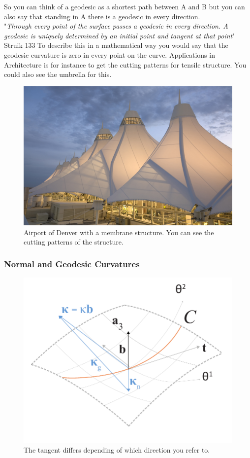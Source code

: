 So you can think of a geodesic as a shortest path between A and B but you can also say that standing in A there is a geodesic in every direction.\\
"\textit{Through every point of the surface passes a geodesic in every direction. A geodesic is uniquely determined by an initial point and tangent at that point}" Struik 133
To describe this in a mathematical way you would say that the geodesic curvature is zero in every point on the curve. 
Applications in Architecture is for instance to get the cutting patterns for tensile structure. You could also see the umbrella for this.


\begin{figure}[H]
\centering
\includegraphics[width=0.9\linewidth ]{figure/Theory/Denver.jpg}

\caption{Airport of Denver with a membrane structure. You can see the cutting patterns of the structure. }
\end{figure}

\subsubsection{Normal and Geodesic Curvatures}

\begin{figure}[H]
\centering
\includegraphics[height=0.6\linewidth ]{figure/Theory/SFF.pdf}
\caption{The tangent differs depending of which direction you refer to. }
\end{figure}

